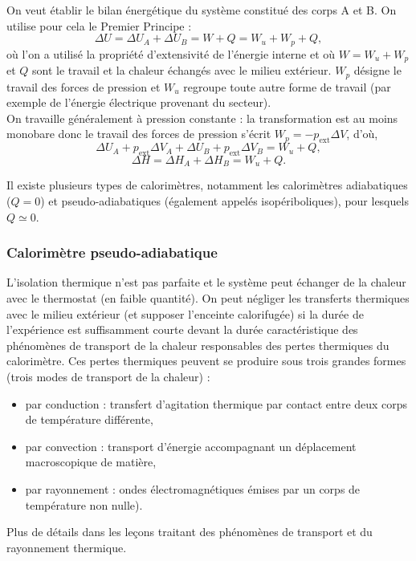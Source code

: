 \documentclass[11pt,a4paper]{report}
\begin{document}
On veut établir le bilan énergétique du système constitué des corps A et B. On utilise pour cela le Premier Principe :
\begin{equation}
	\Delta U = \Delta U_A + \Delta U_B = W + Q = W_u + W_p + Q,
\end{equation}
où l'on a utilisé la propriété d'extensivité de l'énergie interne et où $W = W_u + W_p$ et $Q$ sont le travail et la chaleur échangés avec le milieu extérieur. $W_p$ désigne le travail des forces de pression et $W_u$ regroupe toute autre forme de travail (par exemple de l'énergie électrique provenant du secteur).\\

On travaille généralement à pression constante : la transformation est au moins monobare donc le travail des forces de pression s'écrit $W_p = - p_\text{ext}\Delta V$, d'où,
\begin{equation}
	\Delta U_A + p_\text{ext}\Delta V_A + \Delta U_B + p_\text{ext}\Delta V_B = W_u + Q,
\end{equation}
\begin{equation}
	\Delta H = \Delta H_A + \Delta H_B = W_u + Q.
\end{equation}

Il existe plusieurs types de calorimètres, notamment les calorimètres adiabatiques ($Q = 0$) et pseudo-adiabatiques (également appelés isopériboliques), pour lesquels $Q \simeq 0$.

\subsubsection{Calorimètre pseudo-adiabatique}

L'isolation thermique n'est pas parfaite et le système peut échanger de la chaleur avec le thermostat (en faible quantité). On peut négliger les transferts thermiques avec le milieu extérieur (et supposer l'enceinte calorifugée) si la durée de l'expérience est suffisamment courte devant la durée caractéristique des phénomènes de transport de la chaleur responsables des pertes thermiques du calorimètre. Ces pertes thermiques peuvent se produire sous trois grandes formes (trois modes de transport de la chaleur) :
\begin{itemize}
	\item par conduction : transfert d'agitation thermique par contact entre deux corps de température différente,
	\item par convection : transport d'énergie accompagnant un déplacement macroscopique de matière,
	\item par rayonnement : ondes électromagnétiques émises par un corps de température non nulle).
\end{itemize}
Plus de détails dans les leçons traitant des phénomènes de transport et du rayonnement thermique.\\
\end{document}
